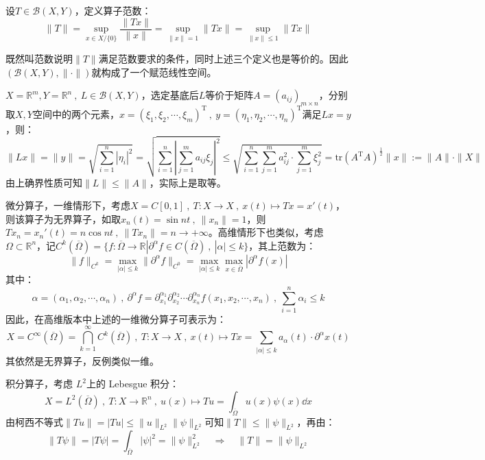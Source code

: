 \begin{definition}[算子范数]\label{definition:szfs}
设$T \in \mathscr{B}(X,Y)$，定义算子范数：
\[\|T\|=\mathop \text{sup}\limits_{x \in X/\{0\}}\frac{\|Tx\|}{\|x\|}=\mathop \text{sup}\limits_{\|x\|=1}\|Tx\|=\mathop \text{sup}\limits_{\|x\| \leq 1}\|Tx\|\]
\end{definition}
既然叫范数说明$\|T\|$满足范数要求的条件，同时上述三个定义也是等价的。因此$(\mathscr{B}(X,Y),\|\cdot\|)$就构成了一个赋范线性空间。
\begin{example}
\quad $X=\mathbb{R}^m,Y=\mathbb{R}^n \ , \ L \in \mathscr{B}(X,Y)$，选定基底后$L$等价于矩阵$A=(a_{ij})_{m \times n}$，分别取$X,Y$空间中的两个元素，$x=(\xi_1,\xi_2,\cdots,\xi_m)^{\text{T}} \ , \ y=(\eta_1,\eta_2,\cdots,\eta_n)^{\text{T}}$满足$Lx=y$，则：
\[\|Lx\|=\|y\|=\sqrt{\sum_{i=1}^n|\eta_i|^2}=\sqrt{\sum_{i=1}^n\left|\sum_{j=1}^ma_{ij}\xi_j\right|^2} \leq \sqrt{\sum_{i=1}^n\sum_{j=1}^ma_{ij}^2 \cdot \sum_{j=1}^m\xi_j^2}=\text{tr}(A^{\text{T}}A)^{\frac{1}{2}}\|x\|:=\|A\|\cdot\|X\|\]
由上确界性质可知$\|L\| \leq \|A\|$，实际上是取等。
\end{example}

\begin{example}
\quad 微分算子，一维情形下，考虑$X=C[0,1] \ , \ T:X \to X \ , \ x(t) \mapsto Tx=x'(t)$，则该算子为无界算子，如取$x_n(t)=\sin nt \ , \ \|x_n\|=1$，则$Tx_n=x_n'(t)=n \cos nt \ , \ \|Tx_n\|=n \to +\infty$。高维情形下也类似，考虑$\Omega \subset \mathbb{R}^n$，记$C^k(\overline{\Omega})=\{f:\overline{\Omega} \to \mathbb{R}|\partial^{\alpha}f \in C(\overline{\Omega}) \ , \ |\alpha| \leq k\}$，其上范数为：
\[\|f\|_{C^k}=\mathop \text{max}\limits_{|\alpha| \leq k}\|\partial^{\alpha}f\|_{C^0}=\mathop \text{max}\limits_{|\alpha| \leq k}\mathop \text{max}\limits_{x \in \overline{\Omega}}|\partial^{\alpha}f(x)|\]
其中：
\[\alpha=(\alpha_1,\alpha_2,\cdots,\alpha_n) \ , \ \partial^{\alpha}f=\partial^{\alpha_1}_{x_1}\partial^{\alpha_2}_{x_2}\cdots\partial^{\alpha_n}_{x_n}f(x_1,x_2,\cdots,x_n) \ , \ \sum_{i=1}^n\alpha_i \leq k\]
因此，在高维版本中上述的一维微分算子可表示为：
\[X=C^{\infty}(\overline{\Omega})=\bigcap_{k=1}^{\infty}C^k(\overline{\Omega}) \ , \ T:X \to X \ , \ x(t) \mapsto Tx=\sum_{|\alpha| \leq k}a_{\alpha}(t)\cdot\partial^{\alpha}x(t)\]
其依然是无界算子，反例类似一维。
\end{example}

\begin{example}
\quad 积分算子，考虑 $L^2$上的 Lebesgue 积分：
\[X=L^2(\overline{\Omega}) \ , \ T:X \to \mathbb{R}^n \ , \ u(x) \mapsto Tu=\int_{\overline{\Omega}}u(x)\psi(x)\dd x\]
由柯西不等式$\|Tu\|=|Tu| \leq \|u\|_{L^2}\|\psi\|_{L^2}$可知$\|T\| \leq \|\psi\|_{L^2}$，再由：
\[\|T\psi\|=|T\psi|=\int_{\overline{\Omega}}|\psi|^2=\|\psi\|_{L^2}^2 \quad \Rightarrow \quad \|T\|=\|\psi\|_{L^2}\]
\end{example}

